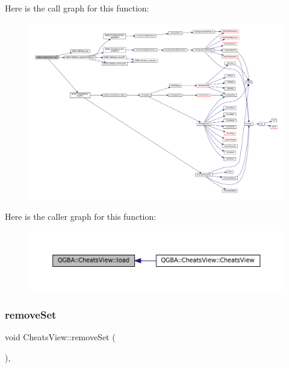 Here is the call graph for this function\+:
\nopagebreak
\begin{figure}[H]
\begin{center}
\leavevmode
\includegraphics[width=350pt]{class_q_g_b_a_1_1_cheats_view_ab2f5f900e87c57c53acf74e9bddbf680_cgraph}
\end{center}
\end{figure}
Here is the caller graph for this function\+:
\nopagebreak
\begin{figure}[H]
\begin{center}
\leavevmode
\includegraphics[width=350pt]{class_q_g_b_a_1_1_cheats_view_ab2f5f900e87c57c53acf74e9bddbf680_icgraph}
\end{center}
\end{figure}
\mbox{\label{class_q_g_b_a_1_1_cheats_view_a43e93973388591b6a0d79dc046980561}} 
\subsubsection{\texorpdfstring{remove\+Set}{removeSet}}
{\footnotesize\ttfamily void Cheats\+View\+::remove\+Set (\begin{DoxyParamCaption}{ }\end{DoxyParamCaption})\hspace{0.3cm}{\ttfamily [private]}, {\ttfamily [slot]}}

